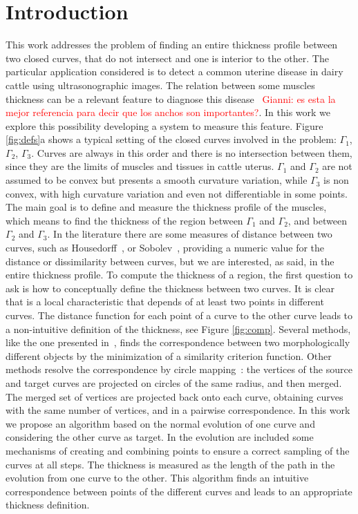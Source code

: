\documentclass{article}
\begin{document}
\section{Introduction}
\label{sec:intro}
This work addresses the problem of finding an entire thickness profile between two closed curves, that do not intersect and one is interior to the other. The particular application considered is to detect a common uterine disease in dairy cattle using ultrasonographic images. 
The relation between some muscles thickness can be a relevant feature to diagnose this disease~\cite{Gianni2010} \textcolor{red}{Gianni: es esta la mejor referencia para decir que los anchos son importantes?}.
In this work we explore this possibility developing a system to measure this feature. Figure \ref{fig:defs}a shows a typical setting of the closed curves involved in the problem: $\Gamma_1$, $\Gamma_2$, $\Gamma_3$. Curves are always in this order and there is no intersection between them, since they are the limits of muscles and tissues in cattle uterus. $\Gamma_1$ and $\Gamma_2$ are not assumed to be convex but presents a smooth curvature variation, while $\Gamma_3$ is non convex, with high curvature variation and even not differentiable in some points. The main goal is to define and measure the thickness profile of the muscles, which means to find the thickness of the region between $\Gamma_1$ and $\Gamma_2$, and between $\Gamma_2$ and $\Gamma_3$. In the literature there are some measures of distance between two curves, such as Housedorff~\cite{libroMorel}, or Sobolev~\cite{statistics}, providing a numeric value for the distance or dissimilarity between curves, but we are interested, as said, in the entire thickness profile. To compute the thickness of a region, the first question to ask is how to conceptually define the thickness between two curves. It is clear that is a local characteristic that depends of at least two points in different curves. The distance function for each point of a curve to the other curve leads to a non-intuitive definition of the thickness, see Figure \ref{fig:comp}. Several methods, like the one presented in~\cite{paperWarping}, finds the correspondence between two morphologically different objects by the minimization of a similarity criterion function. Other methods resolve the correspondence by circle mapping~\cite{libro}: the vertices of the source and target curves are projected on circles of the same radius, and then merged. The merged set of vertices are projected back onto each curve, obtaining curves with the same number of vertices, and in a pairwise correspondence. In this work we propose an algorithm based on the normal evolution of one curve and considering the other curve as target. In the evolution are included some mechanisms of creating and combining points to ensure a correct sampling of the curves at all steps. The thickness is measured as the length of the path in the evolution from one curve to the other. This algorithm finds an intuitive correspondence between points of the different curves and leads to an appropriate thickness definition.
\end{document}

